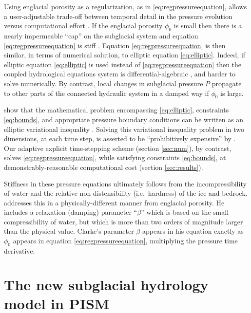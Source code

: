\documentclass[gmd]{copernicus}   %
\begin{document}
Using englacial porosity as a regularization, as in \eqref{eq:regpressureequation}, allows a user-adjustable trade-off between temporal detail in the pressure evolution versus computational effort \citep{vanPeltthesis}.  If the englacial porosity $\phi_0$ is small then there is a nearly impermeable ``cap'' on the subglacial system and equation \eqref{eq:regpressureequation} is stiff \citep{AscherPetzold}.  Equation \eqref{eq:regpressureequation} is then similar, in terms of numerical solution, to elliptic equation \eqref{eq:elliptic}.  Indeed, if elliptic equation \eqref{eq:elliptic} is used instead of \eqref{eq:regpressureequation} then the coupled hydrological equations system is differential-algebraic \citep{AscherPetzold}, and harder to solve numerically.  By contrast, local changes in subglacial pressure $P$ propagate to other parts of the connected hydraulic system in a damped way if $\phi_0$ is large.

\cite{Schoofetal2012} show that the mathematical problem encompassing \eqref{eq:elliptic}, constraints \eqref{eq:bounds}, and appropriate pressure boundary conditions can be written as an elliptic variational inequality \citep{KinderlehrerStampacchia}.  Solving this variational inequality problem in two dimensions, at each time step, is asserted to be ``prohibitively expensive'' by \cite{Werderetal2013}.  Our adaptive explicit time-stepping scheme (section \ref{sec:num}), by contrast, solves \eqref{eq:regpressureequation}, while satisfying constraints \eqref{eq:bounds}, at demonstrably-reasonable computational cost (section \ref{sec:results}).

Stiffness in these pressure equations ultimately follows from the incompressibility of water and the relative non-distensibility (i.e.~hardness) of the ice and bedrock.  \cite{Clarke2003} addresses this in a physically-different manner from englacial porosity.  He includes a relaxation (damping) parameter  ``$\beta$'' which is based on the small compressibility of water, but which is more than two orders of magnitude larger than the physical value.  Clarke's parameter $\beta$ appears in his equation exactly as $\phi_0$ appears in equation \eqref{eq:regpressureequation}, multiplying the pressure time derivative.


\section{The new subglacial hydrology model in PISM} \label{sec:newmodel}
\end{document}
